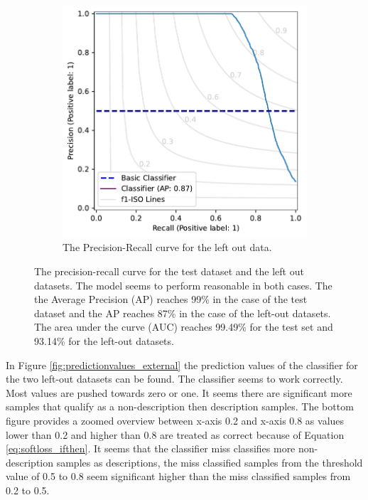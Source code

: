 \documentclass[a4paper, 12pt, oneside]{book} %
\begin{document}
\begin{figure} [htpb]
\begin{subfigure}[b]{0.49\textwidth}
         \includegraphics[width=\textwidth]{precision_recall_plot_extern.pdf}
         \caption{The Precision-Recall curve for the left out data.}
         \label{fig:precision_recall_curve_test_external}
     \end{subfigure}
     \caption[Precision recall curves for test and left-out datasets]{The precision-recall curve for the test dataset and the left out datasets. The model seems to perform reasonable in both cases. The the Average Precision (AP) reaches 99\% in the case of the test dataset and the AP reaches 87\% in the case of the left-out datasets. The area under the curve (AUC) reaches 99.49\% for the test set and 93.14\% for the left-out datasets.}
     \label{fig:precision-recall}
\end{figure}

In Figure \ref{fig:predictionvalues_external} the prediction values of the classifier for the two left-out datasets can be found.
The classifier seems to work correctly.
Most values are pushed towards zero or one.
It seems there are significant more samples that qualify as a non-description then description samples.
The bottom figure provides a zoomed overview between x-axis 0.2 and x-axis 0.8 as values lower than 0.2 and higher than 0.8 are treated as correct because of Equation \ref{eq:softloss_ifthen}.
It seems that the classifier miss classifies more non-description samples as descriptions, the miss classified samples from the threshold value of 0.5 to 0.8 seem significant higher than the miss classified samples from 0.2 to 0.5.
\end{document}

